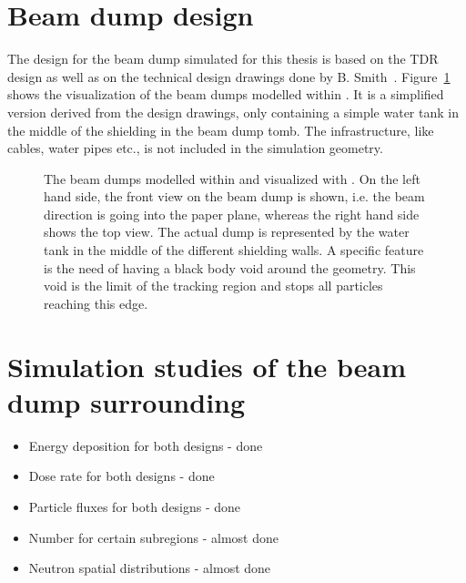\section{Beam dump design}
\label{BeamDumps:design}
The design for the beam dump simulated for this thesis is based on the TDR design as well as on the technical design drawings done by B. Smith~\cite{Smith_drawings}.
Figure~\ref{fig:BeamDumps:geometry} shows the visualization of the beam dumps modelled within \fluka. It is a simplified version derived from the design drawings, only containing a simple water tank in the middle of the shielding in the beam dump tomb. The infrastructure, like cables, water pipes etc., is not included in the simulation geometry.

\begin{figure}
\begin{center}
\caption[Geometry of the simulated beam dumps.]{The beam dumps modelled within \fluka and visualized with \flair. On the left hand side, the front view on the beam dump is shown, i.e. the beam direction is going into the paper plane, whereas the right hand side shows the top view. The actual dump is represented by the water tank in the middle of the different shielding walls. A \fluka specific feature is the need of having a black body void around the geometry. This void is the limit of the tracking region and stops all particles reaching this edge.}
\label{fig:BeamDumps:geometry}
\end{center}
\end{figure}

\section{Simulation studies of the beam dump surrounding}
\label{BeamDumps:sim_surrounding}

\begin{itemize}
 \item Energy deposition for both designs - done
 \item Dose rate for both designs - done 
 \item Particle fluxes for both designs - done 
 \item Number for certain subregions - almost done
 \item Neutron spatial distributions - almost done
\end{itemize}


